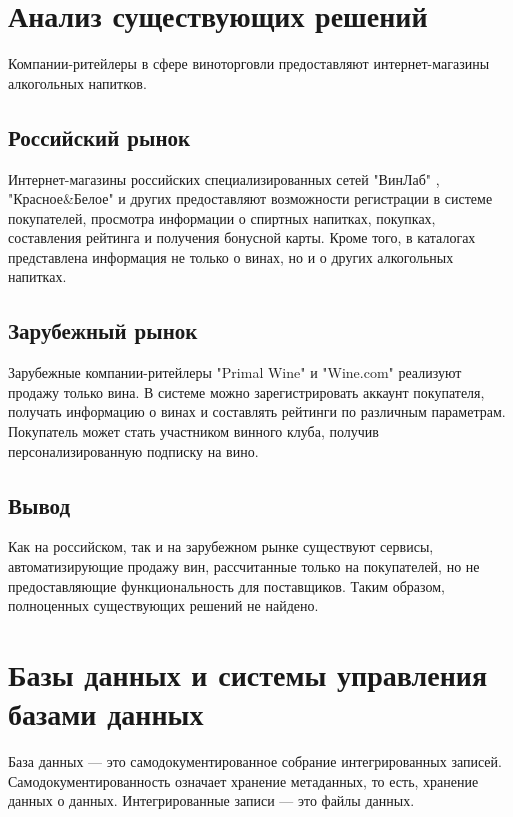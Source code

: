 \section{Анализ существующих решений}

Компании-ритейлеры в сфере виноторговли предоставляют интернет-магазины алкогольных напитков.

\subsection{Российский рынок}

Интернет-магазины российских специализированных сетей "ВинЛаб" \cite{winelab}, "Красное\&Белое" \cite{kb} и других предоставляют возможности 
регистрации в системе покупателей, просмотра информации о спиртных напитках, покупках, составления рейтинга и получения бонусной карты. Кроме того, в каталогах представлена информация не только о винах, но и о других алкогольных напитках.

\subsection{Зарубежный рынок}

Зарубежные компании-ритейлеры "Primal Wine" \cite{primal_wine} и "Wine.com" \cite{wine_com} реализуют продажу только вина. В системе можно зарегистрировать аккаунт покупателя, получать информацию о винах и составлять рейтинги по различным параметрам. Покупатель может стать участником винного клуба, получив персонализированную подписку на вино. 

\subsection{Вывод}

Как на российском, так и на зарубежном рынке существуют сервисы, автоматизирующие продажу вин, рассчитанные только на покупателей, но не предоставляющие функциональность для поставщиков. Таким образом, полноценных существующих решений не найдено.

\section{Базы данных и системы управления базами данных}

База данных --- это самодокументированное собрание интегрированных записей. Самодокументированность означает хранение метаданных, то есть, хранение данных о данных. Интегрированные записи --- это файлы данных.


